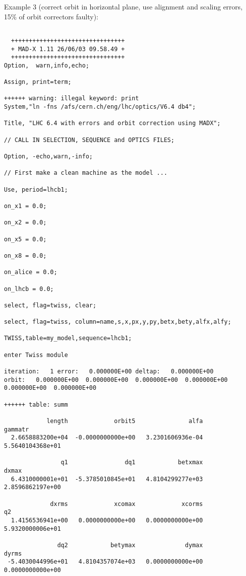  Example 3 (correct orbit in horizontal plane, use alignment and scaling errors, 15\% of orbit correctors faulty): 
\begin{verbatim}

  ++++++++++++++++++++++++++++++++
  + MAD-X 1.11 26/06/03 09.58.49 +
  ++++++++++++++++++++++++++++++++
Option,  warn,info,echo;

Assign, print=term;

++++++ warning: illegal keyword: print
System,"ln -fns /afs/cern.ch/eng/lhc/optics/V6.4 db4";

Title, "LHC 6.4 with errors and orbit correction using MADX";

// CALL IN SELECTION, SEQUENCE and OPTICS FILES;

Option, -echo,warn,-info;

// First make a clean machine as the model ...

Use, period=lhcb1;

on_x1 = 0.0;

on_x2 = 0.0;

on_x5 = 0.0;

on_x8 = 0.0;

on_alice = 0.0;

on_lhcb = 0.0;

select, flag=twiss, clear;

select, flag=twiss, column=name,s,x,px,y,py,betx,bety,alfx,alfy;

TWISS,table=my_model,sequence=lhcb1; 

enter Twiss module
  
iteration:   1 error:   0.000000E+00 deltap:   0.000000E+00
orbit:   0.000000E+00  0.000000E+00  0.000000E+00  0.000000E+00  0.000000E+00  0.000000E+00

++++++ table: summ

            length             orbit5               alfa            gammatr 
  2.6658883200e+04  -0.0000000000e+00   3.2301606936e-04   5.5640104368e+01 

                q1                dq1            betxmax              dxmax 
  6.4310000001e+01  -5.3785010845e+01   4.8104299277e+03   2.8596862197e+00 

             dxrms             xcomax             xcorms                 q2 
  1.4156536941e+00   0.0000000000e+00   0.0000000000e+00   5.9320000006e+01 

               dq2            betymax              dymax              dyrms 
 -5.4030044996e+01   4.8104357074e+03   0.0000000000e+00   0.0000000000e+00 


\end{verbatim}

